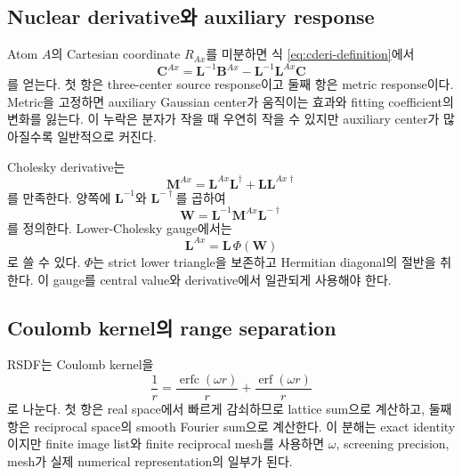 \subsection{Nuclear derivative와 auxiliary response}

Atom $A$의 Cartesian coordinate $R_{Ax}$를 미분하면 식
\eqref{eq:cderi-definition}에서
\begin{equation}
 \mathbf C^{Ax}
 =\mathbf L^{-1}\mathbf B^{Ax}
 -\mathbf L^{-1}\mathbf L^{Ax}\mathbf C
 \label{eq:cderi-response}
\end{equation}
를 얻는다. 첫 항은 three-center source response이고 둘째 항은 metric response이다.
Metric을 고정하면 auxiliary Gaussian center가 움직이는 효과와 fitting coefficient의
변화를 잃는다. 이 누락은 분자가 작을 때 우연히 작을 수 있지만 auxiliary center가
많아질수록 일반적으로 커진다.

Cholesky derivative는
\begin{equation}
 \mathbf M^{Ax}=\mathbf L^{Ax}\mathbf L^\dagger
 +\mathbf L\mathbf L^{Ax\dagger}
 \label{eq:cholesky-response}
\end{equation}
를 만족한다. 양쪽에 $\mathbf L^{-1}$와 $\mathbf L^{-\dagger}$를 곱하여
\begin{equation}
 \mathbf W=\mathbf L^{-1}\mathbf M^{Ax}\mathbf L^{-\dagger}
\end{equation}
를 정의한다. Lower-Cholesky gauge에서는
\begin{equation}
 \mathbf L^{Ax}=\mathbf L\,\Phi(\mathbf W)
\end{equation}
로 쓸 수 있다. $\Phi$는 strict lower triangle을 보존하고 Hermitian diagonal의
절반을 취한다. 이 gauge를 central value와 derivative에서 일관되게 사용해야 한다.

\subsection{Coulomb kernel의 range separation}

RSDF는 Coulomb kernel을
\begin{equation}
 \frac{1}{r}
 =\frac{\operatorname{erfc}(\omega r)}{r}
 +\frac{\operatorname{erf}(\omega r)}{r}
 \label{eq:range-separation}
\end{equation}
로 나눈다. 첫 항은 real space에서 빠르게 감쇠하므로 lattice sum으로 계산하고, 둘째
항은 reciprocal space의 smooth Fourier sum으로 계산한다. 이 분해는 exact identity이지만
finite image list와 finite reciprocal mesh를 사용하면 $\omega$, screening precision,
mesh가 실제 numerical representation의 일부가 된다.

